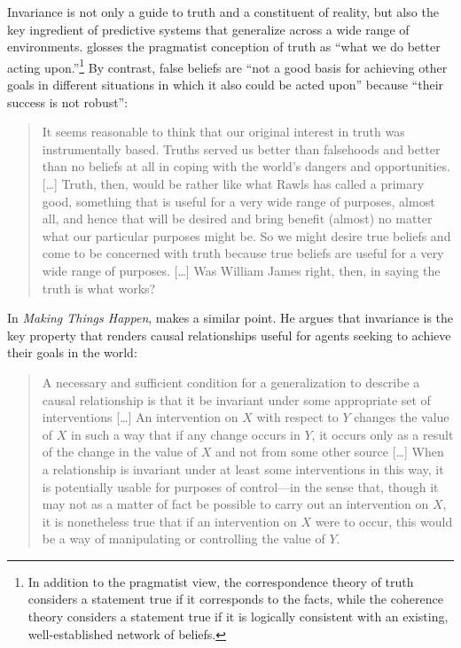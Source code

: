 Invariance is not only a guide to truth and a constituent of reality, but also the key ingredient of predictive systems that generalize across a wide range of environments. \citet[p. 45]{nozick2001} glosses the pragmatist conception of truth as ``what we do better acting upon.''\footnote{In addition to the pragmatist view, the correspondence theory of truth considers a statement true if it corresponds to the facts, while the coherence theory considers a statement true if it is logically consistent with an existing, well-established network of beliefs.} By contrast, false beliefs are ``not a good basis for achieving other goals in different situations in which it also could be acted upon'' because ``their success is not robust'':
\begin{quote}
It seems reasonable to think that our original interest in truth was instrumentally based. Truths served us better than falsehoods and better than no beliefs at all in coping with the world's dangers and opportunities. [\ldots] Truth, then, would be rather like what Rawls has called a primary good, something that is useful for a very wide range of purposes, almost all, and hence that will be desired and bring benefit (almost) no matter what our particular purposes might be. So we might desire true beliefs and come to be concerned with truth because true beliefs are useful for a very wide range of purposes. [\ldots] Was William James right, then, in saying the truth is what works?~\citep[pp. 44--45]{nozick2001}
\end{quote}

In \emph{Making Things Happen}, \citet{woodward2003} makes a similar point. He argues that invariance is the key property that renders causal relationships useful for agents seeking to achieve their goals in the world:
\begin{quote}
  A necessary and sufficient condition for a generalization to describe a causal relationship is that it be invariant under some appropriate set of interventions [\ldots] An intervention on $X$ with respect to $Y$ changes the value of $X$ in such a way that if any change occurs in $Y$, it occurs only as a result of the change in the value of $X$ and not from some other source [\ldots] When a relationship is invariant under at least some interventions in this way, it is potentially usable for purposes of control---in the sense that, though it may not as a matter of fact be possible to carry out an intervention on $X$, it is nonetheless true that if an intervention on $X$ were to occur, this would be a way of manipulating or controlling the value of $Y$.~\citep[pp. 15--16]{woodward2003}
\end{quote}

